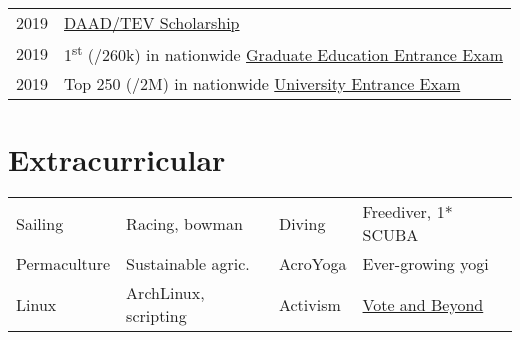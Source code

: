 \documentclass[]{resume}
\begin{document}
\begin{minipage}[t]{0.66\textwidth}
\begin{minipage}[t]{0.90\textwidth}
		\begin{tabular}{@{}rl}
			2019 & \href{https://www2.daad.de/deutschland/stipendium/datenbank/en/21148-scholarship-database?detail=50016578}{DAAD/TEV Scholarship}                                        \\
			2019 & 1\textsuperscript{st} (/260k) in nationwide \href{https://tr.wikipedia.org/wiki/Akademik_Personel_ve_Lisansüstü_Eğitimi_Giriş_Sınavı}{Graduate Education Entrance Exam} \\
			2019 & Top 250 (/2M) in nationwide \href{https://en.wikipedia.org/wiki/Student_Selection_and_Placement_System}{University Entrance Exam}                                       \\
		\end{tabular}
		\sectionsep

		\section{Extracurricular}



		\begin{tabular}{@{}ll|ll} %
			Sailing      & Racing, bowman       & Diving   & Freediver, 1* SCUBA                                                   \\
			Permaculture & Sustainable agric.   & AcroYoga & Ever-growing yogi                                                     \\
			Linux        & ArchLinux, scripting & Activism & \href{https://en.wikipedia.org/wiki/Vote_and_Beyond}{Vote and Beyond} \\
		\end{tabular}




	\end{minipage}
\end{minipage}
\end{document}
